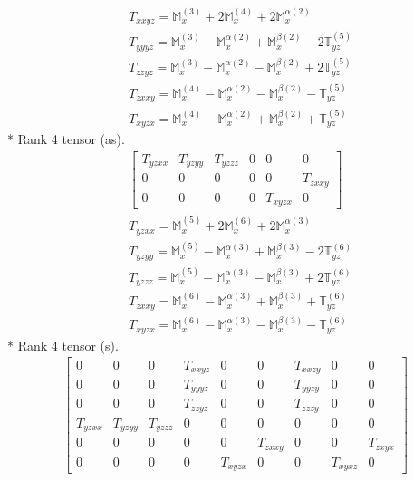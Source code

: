 \documentclass[fleqn,8pt,landscape]{jsarticle}
\begin{document}
\begin{align*}
& T_{xxyz} = \mathbb{M}_{x}^{(3)} + 2 \mathbb{M}_{x}^{(4)} + 2 \mathbb{M}_{x}^{\alpha(2)} \\
& T_{yyyz} = \mathbb{M}_{x}^{(3)} - \mathbb{M}_{x}^{\alpha(2)} + \mathbb{M}_{x}^{\beta(2)} - 2 \mathbb{T}_{yz}^{(5)} \\
& T_{zzyz} = \mathbb{M}_{x}^{(3)} - \mathbb{M}_{x}^{\alpha(2)} - \mathbb{M}_{x}^{\beta(2)} + 2 \mathbb{T}_{yz}^{(5)} \\
& T_{zxxy} = \mathbb{M}_{x}^{(4)} - \mathbb{M}_{x}^{\alpha(2)} - \mathbb{M}_{x}^{\beta(2)} - \mathbb{T}_{yz}^{(5)} \\
& T_{xyzx} = \mathbb{M}_{x}^{(4)} - \mathbb{M}_{x}^{\alpha(2)} + \mathbb{M}_{x}^{\beta(2)} + \mathbb{T}_{yz}^{(5)}
\end{align*}
* Rank 4 tensor (as).
\begin{align*}
\begin{bmatrix} T_{yzxx} & T_{yzyy} & T_{yzzz} & 0 & 0 & 0 \\ 0 & 0 & 0 & 0 & 0 & T_{zxxy} \\ 0 & 0 & 0 & 0 & T_{xyzx} & 0 \end{bmatrix}
\end{align*}
\begin{align*}
& T_{yzxx} = \mathbb{M}_{x}^{(5)} + 2 \mathbb{M}_{x}^{(6)} + 2 \mathbb{M}_{x}^{\alpha(3)} \\
& T_{yzyy} = \mathbb{M}_{x}^{(5)} - \mathbb{M}_{x}^{\alpha(3)} + \mathbb{M}_{x}^{\beta(3)} - 2 \mathbb{T}_{yz}^{(6)} \\
& T_{yzzz} = \mathbb{M}_{x}^{(5)} - \mathbb{M}_{x}^{\alpha(3)} - \mathbb{M}_{x}^{\beta(3)} + 2 \mathbb{T}_{yz}^{(6)} \\
& T_{zxxy} = \mathbb{M}_{x}^{(6)} - \mathbb{M}_{x}^{\alpha(3)} + \mathbb{M}_{x}^{\beta(3)} + \mathbb{T}_{yz}^{(6)} \\
& T_{xyzx} = \mathbb{M}_{x}^{(6)} - \mathbb{M}_{x}^{\alpha(3)} - \mathbb{M}_{x}^{\beta(3)} - \mathbb{T}_{yz}^{(6)}
\end{align*}
* Rank 4 tensor (s).
\begin{align*}
\begin{bmatrix} 0 & 0 & 0 & T_{xxyz} & 0 & 0 & T_{xxzy} & 0 & 0 \\ 0 & 0 & 0 & T_{yyyz} & 0 & 0 & T_{yyzy} & 0 & 0 \\ 0 & 0 & 0 & T_{zzyz} & 0 & 0 & T_{zzzy} & 0 & 0 \\ T_{yzxx} & T_{yzyy} & T_{yzzz} & 0 & 0 & 0 & 0 & 0 & 0 \\ 0 & 0 & 0 & 0 & 0 & T_{zxxy} & 0 & 0 & T_{zxyx} \\ 0 & 0 & 0 & 0 & T_{xyzx} & 0 & 0 & T_{xyxz} & 0 \end{bmatrix}
\end{align*}
\end{document}
